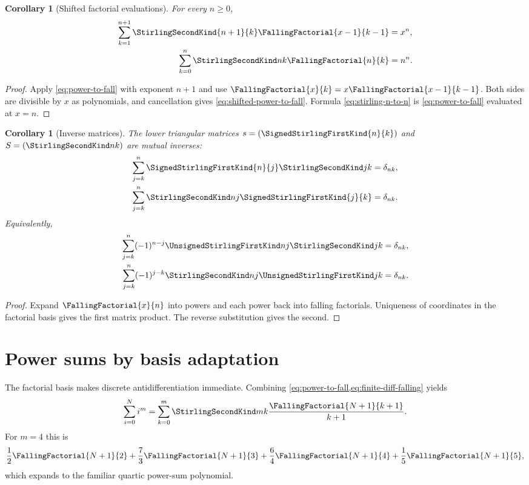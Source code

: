 \documentclass[11pt,a4paper,oneside,openany]{book}
\newtheorem{corollary}[theorem]{Corollary}
\theoremstyle{definition}
\theoremstyle{remark}
\begin{document}
\begin{corollary}[Shifted factorial evaluations]
\label{cor:shifted-stirling-evaluations}
For every $n\ge0$,
\begin{align}
 \sum_{k=1}^{n+1}\StirlingSecondKind{n+1}{k}\FallingFactorial{x-1}{k-1}&=x^n,
 \label{eq:shifted-power-to-fall}\\
 \sum_{k=0}^{n}\StirlingSecondKind nk\FallingFactorial{n}{k}&=n^n.
 \label{eq:stirling-n-to-n}
\end{align}
\end{corollary}
\begin{proof}
Apply \eqref{eq:power-to-fall} with exponent $n+1$ and use
$\FallingFactorial{x}{k}=x\FallingFactorial{x-1}{k-1}$.  Both sides are divisible by $x$ as
polynomials, and cancellation gives \eqref{eq:shifted-power-to-fall}.  Formula
\eqref{eq:stirling-n-to-n} is \eqref{eq:power-to-fall} evaluated at $x=n$.
\end{proof}
\begin{corollary}[Inverse matrices]\label{cor:stirling-inverse}
The lower triangular matrices $s=(\SignedStirlingFirstKind{n}{k})$ and $S=(\StirlingSecondKind nk)$ are mutual inverses:
\begin{align}
 \sum_{j=k}^n\SignedStirlingFirstKind{n}{j}\StirlingSecondKind jk&=\delta_{nk},\label{eq:stirling-inv1}\\
 \sum_{j=k}^n\StirlingSecondKind nj \SignedStirlingFirstKind{j}{k}&=\delta_{nk}.\label{eq:stirling-inv2}
\end{align}
Equivalently,
\begin{align}
 \sum_{j=k}^n(-1)^{n-j}\UnsignedStirlingFirstKind nj\StirlingSecondKind jk&=\delta_{nk},\\
 \sum_{j=k}^n(-1)^{j-k}\StirlingSecondKind nj\UnsignedStirlingFirstKind jk&=\delta_{nk}.
\end{align}
\end{corollary}
\begin{proof}
Expand $\FallingFactorial{x}{n}$ into powers and each power back into falling factorials.
Uniqueness of coordinates in the factorial basis gives the first matrix product.
The reverse substitution gives the second.
\end{proof}

\section{Power sums by basis adaptation}
The factorial basis makes discrete antidifferentiation immediate.  Combining
\cref{eq:power-to-fall,eq:finite-diff-falling} yields
\begin{equation}\label{eq:power-sum-stirling}
 \sum_{i=0}^{N}i^m
 =\sum_{k=0}^m\StirlingSecondKind mk\frac{\FallingFactorial{N+1}{k+1}}{k+1}.
\end{equation}
For $m=4$ this is
\[
 \frac12\FallingFactorial{N+1}{2}+\frac73\FallingFactorial{N+1}{3}
 +\frac64\FallingFactorial{N+1}{4}+\frac15\FallingFactorial{N+1}{5},
\]
which expands to the familiar quartic power-sum polynomial.
\end{document}
